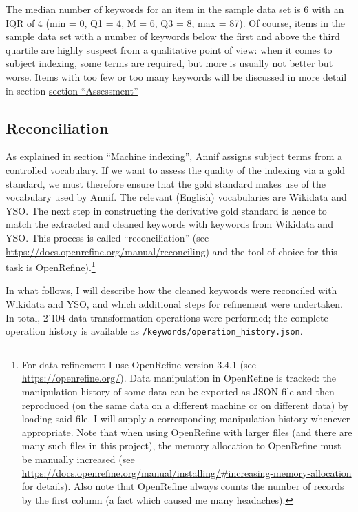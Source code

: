 The median number of keywords for an item in the sample data set is 6
with an IQR of 4 (min = 0, Q1 = 4, M = 6, Q3 = 8, max = 87). Of course,
items in the sample data set with a number of keywords below the first
and above the third quartile are highly suspect from a qualitative point
of view: when it comes to subject indexing, some terms are required, but
more is usually not better but worse. Items with too few or too many
keywords will be discussed in more detail in section
\protect\hyperlink{assessment}{section ``Assessment''}

\hypertarget{reconciliation}{%
\subsection{Reconciliation}\label{reconciliation}}

As explained in \protect\hyperlink{machine-indexing}{section ``Machine
indexing''}, Annif assigns subject terms from a controlled vocabulary.
If we want to assess the quality of the indexing via a gold standard, we
must therefore ensure that the gold standard makes use of the vocabulary
used by Annif. The relevant (English) vocabularies are Wikidata and YSO.
The next step in constructing the derivative gold standard is hence to
match the extracted and cleaned keywords with keywords from Wikidata and
YSO. This process is called ``reconciliation'' (see
\url{https://docs.openrefine.org/manual/reconciling}) and the tool of
choice for this task is OpenRefine).\footnote{For data refinement I use
  OpenRefine version 3.4.1 (see \url{https://openrefine.org/}). Data
  manipulation in OpenRefine is tracked: the manipulation history of
  some data can be exported as JSON file and then reproduced (on the
  same data on a different machine or on different data) by loading said
  file. I will supply a corresponding manipulation history whenever
  appropriate. Note that when using OpenRefine with larger files (and
  there are many such files in this project), the memory allocation to
  OpenRefine must be manually increased (see
  \url{https://docs.openrefine.org/manual/installing/\#increasing-memory-allocation}
  for details). Also note that OpenRefine always counts the number of
  records by the first column (a fact which caused me many headaches).}

In what follows, I will describe how the cleaned keywords were
reconciled with Wikidata and YSO, and which additional steps for
refinement were undertaken. In total, 2'104 data transformation
operations were performed; the complete operation history is available
as \texttt{/keywords/operation\_history.json}.

